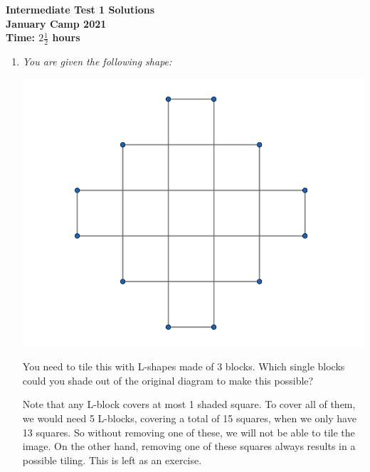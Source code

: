 \documentclass{article}
\begin{document}
\thispagestyle{empty}

\begin{center}
  \textbf{\Large Intermediate Test 1 Solutions}
  \\ \vspace{1em}
  \textbf{\large January Camp 2021}
  \\ \vspace{1em}
  \textbf{\large Time: $2\frac{1}{2}$ hours}
\end{center}

\vspace{24pt}

\begin{enumerate}[1.]

\item {\itshape You are given the following shape: %
	\begin{center}
	\includegraphics[scale=0.3]{Capture.png}	
	\end{center}
You need to tile this with L-shapes made of 3 blocks. Which single blocks could you shade out of the original diagram to make this possible? }

Note that any L-block covers at most 1 shaded square. To cover all of them, we would need 5 L-blocks, covering a total of 15 squares, when we only have 13 squares. So without removing one of these, we will not be able to tile the image. On the other hand, removing one of these squares always results in a possible tiling. This is left as an exercise.


\end{enumerate}
\end{document}
